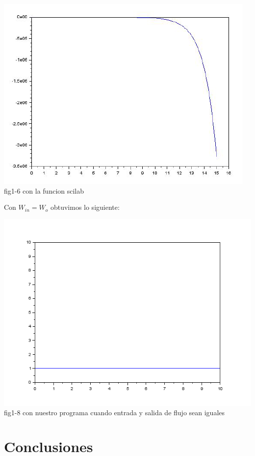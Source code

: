 \documentclass[12pt,a4paper]{IEEEtran}
\begin{document}
\begin{center}
	\includegraphics[scale = 0.6]{images/funcionscilab2}\\
	{fig1-6 con la funcion scilab}
\end{center}




Con $W_{in}=W_{o}$ obtuvimos lo siguiente: 

\begin{center}
	\includegraphics[scale = 0.4]{images/h}\\
	{fig1-8 con nuestro programa cuando entrada y salida de flujo sean iguales}
\end{center}

\section{Conclusiones}
\end{document}
